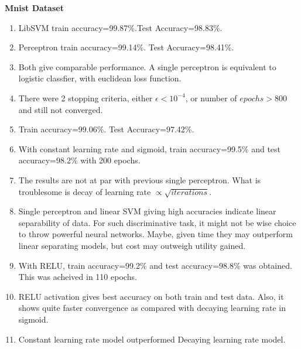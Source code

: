 \documentclass{article}
\newcommand{\bld}[1]{\textbf{#1}}
\begin{document}
\bld{Mnist Dataset}
\begin{enumerate}
	\item LibSVM train accuracy=99.87\%.Test Accuracy=98.83\%.
	\item Perceptron train accuracy=99.14\%. Test Accuracy=98.41\%.
	\item Both give comparable performance. A single perceptron is equivalent to logistic classfier, with euclidean loss function.
	\item There were 2 stopping criteria, either $\epsilon<10^{-4}$, or number of $epochs>800$ and still not converged.
	\item Train accuracy=99.06\%. Test Accuracy=97.42\%.
	\item With constant learning rate and sigmoid, train accuracy=99.5\% and test accuracy=98.2\% with 200 epochs.
	\item The results are not at par with previous single perceptron. What is troublesome is decay of learning rate $\propto \sqrt{iterations}$.
	\item Single perceptron and linear SVM giving high accuracies indicate linear separability of data. For such discriminative task, it might not be wise choice to throw powerful neural networks. Maybe, given time they may outperform linear separating models, but cost may outweigh utility gained. 
	\item With RELU, train accuracy=99.2\% and test accuracy=98.8\% was obtained. This was acheived in 110 epochs.
	\item RELU activation gives best accuracy on both train and test data. Also, it shows quite faster convergence as compared with decaying learning rate in sigmoid. 
	\item Constant learning rate model outperformed Decaying learning rate model.
\end{enumerate}
\end{document}
